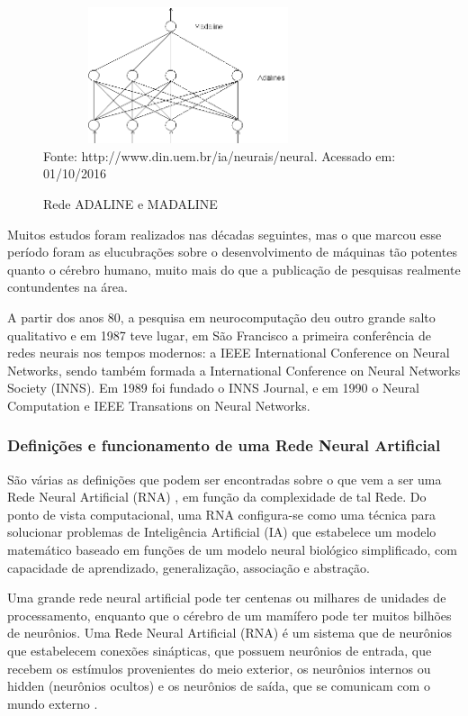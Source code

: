 \begin{figure}[!ht]
\centering
\caption{Rede ADALINE e MADALINE}
\vspace{1mm}
\includegraphics[width=85mm, height=40mm]{Figuras/Neural/Adaline.png}\\
\tiny Fonte: http://www.din.uem.br/ia/neurais/neural. Acessado em: 01/10/2016
\end{figure}


Muitos estudos foram realizados nas décadas seguintes, mas o que marcou esse período foram as elucubrações sobre o 
desenvolvimento de máquinas tão potentes quanto o cérebro humano, muito mais do que a publicação de pesquisas realmente 
contundentes na área.

A partir dos anos 80, a pesquisa em neurocomputação deu outro grande salto qualitativo e em 1987 teve lugar, em São Francisco a 
primeira conferência de redes neurais nos tempos modernos: a IEEE International Conference on Neural Networks, sendo também formada 
a International Conference on Neural Networks Society (INNS). 
Em 1989 foi fundado o INNS Journal, e em 1990 o Neural Computation e IEEE Transations on Neural Networks.

\subsubsection{Definições e funcionamento de uma Rede Neural Artificial}

São várias as definições que podem ser encontradas sobre o que vem a ser uma Rede Neural Artificial (RNA) \cite{Castanheira2008}, em função da complexidade de tal Rede. 
Do ponto de vista computacional, uma RNA configura-se como uma técnica para solucionar problemas de Inteligência Artificial (IA) que estabelece um modelo matemático 
baseado em funções de um modelo neural biológico simplificado, com capacidade de aprendizado, generalização, associação e abstração.

Uma grande rede neural artificial pode ter centenas ou milhares de unidades de processamento, enquanto que o cérebro de um mamífero pode ter muitos bilhões de neurônios. 
Uma Rede Neural Artificial (RNA) é um sistema que de neurônios que estabelecem conexões sinápticas, que possuem neurônios de entrada, que recebem os estímulos provenientes 
do meio exterior, os neurônios internos ou hidden (neurônios ocultos) e os neurônios de saída, que se comunicam com o mundo externo \cite{Tatibana}.

